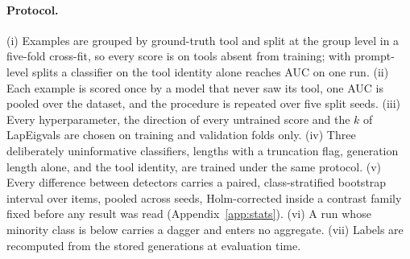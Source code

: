 \paragraph{Protocol.}
\label{sec:method:protocol}
(i) Examples are grouped by ground-truth tool and split at the group level in a five-fold cross-fit, so every
score is on tools absent from training; with prompt-level splits a classifier on the tool identity alone
reaches \aucToolConfoundLlamaOneBGlaiveAll{} AUC on one run. (ii) Each example is scored once by a model that
never saw its tool, one AUC is pooled over the dataset, and the procedure is repeated over five split seeds.
(iii) Every hyperparameter, the direction of every untrained score and the $k$ of LapEigvals are chosen on
training and validation folds only. (iv) Three deliberately uninformative classifiers, lengths with a
truncation flag, generation length alone, and the tool identity, are trained under the same protocol. (v)
Every difference between detectors carries a paired, class-stratified bootstrap interval over items, pooled
across seeds, Holm-corrected inside a contrast family fixed before any result was read
(Appendix~\ref{app:stats}). (vi) A run whose minority class is below \minClassPerSubset{} carries a dagger
and enters no aggregate. (vii) Labels are recomputed from the stored generations at evaluation time.
